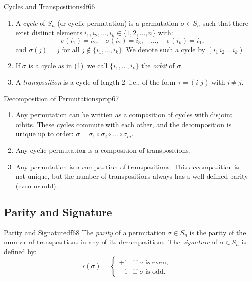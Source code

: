\documentclass[11pt, a4paper]{article}
\begin{document}
\begin{definition}{Cycles and Transpositions}{df66}
  \begin{enumerate}
    \item A \emph{cycle} of $S_n$ (or cyclic permutation) is a permutation $\sigma \in S_n$ such that there exist distinct elements $i_1, i_2, \dots, i_k \in \{1, 2, \dots, n\}$ with:
    \[
      \sigma(i_1) = i_2, \quad \sigma(i_2) = i_3, \quad \dots, \quad \sigma(i_k) = i_1,
    \]
    and $\sigma(j) = j$ for all $j \notin \{i_1, \dots, i_k\}$.
    We denote such a cycle by $(i_1 \, i_2 \, \dots \, i_k)$.
    \item If $\sigma$ is a cycle as in (1), we call $\{i_1, \dots, i_k\}$ the \emph{orbit} of $\sigma$.
    \item A \emph{transposition} is a cycle of length 2, i.e., of the form $\tau = (i \,\, j)$ with $i \neq j$.
  \end{enumerate}
\end{definition}

\begin{proposition}{Decomposition of Permutations}{prop67}
  \begin{enumerate}
    \item Any permutation can be written as a composition of cycles with disjoint orbits. These cycles commute with each other, and the decomposition is unique up to order: $\sigma = \sigma_1 \circ \sigma_2 \circ \dots \circ \sigma_m$.
    \item Any cyclic permutation is a composition of transpositions.
    \item Any permutation is a composition of transpositions. This decomposition is not unique, but the number of transpositions always has a well-defined parity (even or odd).
  \end{enumerate}
\end{proposition}

\subsection{Parity and Signature}

\begin{definition}{Parity and Signature}{df68}
  The \emph{parity} of a permutation $\sigma \in S_n$ is the parity of the number of transpositions in any of its decompositions.
  The \emph{signature} of $\sigma \in S_n$ is defined by:
  \[
    \epsilon(\sigma) = 
    \begin{cases} 
      +1 & \text{if } \sigma \text{ is even}, \\
      -1 & \text{if } \sigma \text{ is odd}.
    \end{cases}
  \]
\end{definition}
\end{document}
